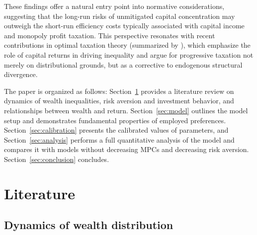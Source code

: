 \documentclass[12pt]{article}
\begin{document}
These findings offer a natural entry point into normative considerations, suggesting that the long-run risks of unmitigated capital concentration may outweigh the short-run efficiency costs typically associated with capital income and monopoly profit taxation. This perspective resonates with recent contributions in optimal taxation theory (summarized by \textcite{bastani2020}), which emphasize the role of capital returns in driving inequality and argue for progressive taxation not merely on distributional grounds, but as a corrective to endogenous structural divergence. 

The paper is organized as follows: Section~\ref{sec:literature} provides a literature review on dynamics of wealth inequalities, risk aversion and investment behavior, and relationships between wealth and return. Section~\ref{sec:model} outlines the model setup and demonstrates fundamental properties of employed preferences. Section~\ref{sec:calibration} presents the calibrated values of parameters, and Section~\ref{sec:analysis} performs a full quantitative analysis of the model and compares it with models without decreasing MPCs and decreasing risk aversion. Section~\ref{sec:conclusion} concludes.

\section{Literature}
\label{sec:literature}

\subsection{Dynamics of wealth distribution}
\end{document}

